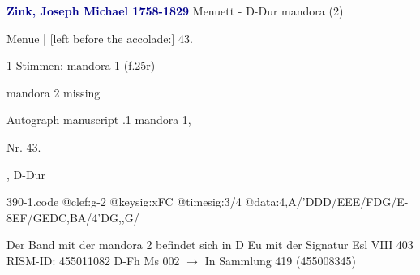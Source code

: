 \documentclass[twocolumn]{book}
\begin{document}
\newline \par \vspace{7pt} \textcolor{darkblue}{\textbf{Zink, Joseph Michael  1758-1829}}
\newline Menuett - D-Dur
\newline mandora (2)
\newline \begin{itshape}[f.25r, at left:] Menue | [left before the accolade:] 43.\end{itshape} 
\newline \textcolor{darkblue}{}  1 Stimmen: mandora 1  (f.25r)
\newline \begin{small} mandora 2 missing\end{small} 
\newline Autograph manuscript
.1  mandora 1, \begin{itshape}Nr. 43.\end{itshape}, D-Dur  
\begin{filecontents*}{390-1.code}
@clef:g-2
@keysig:xFC
@timesig:3/4
@data:4,A/'DDD/EEE/FDG/E-{8EF}/{GE}{DC}{,BA}/4'DG,,G/
\end{filecontents*}
\newline
%
\newline Der Band mit der mandora 2 befindet sich in D Eu mit der Signatur Esl VIII 403
\newline RISM-ID: 455011082
\newline D-Fh  Ms 002
\newline $\rightarrow$ In Sammlung 419 (455008345)
      
\end{document}
